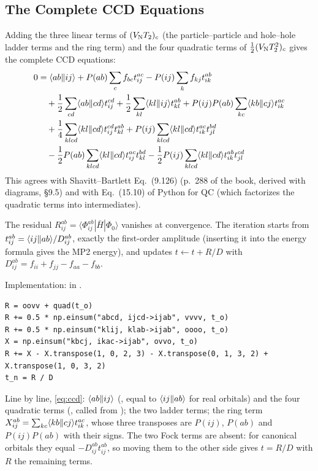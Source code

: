 \subsection{The Complete CCD Equations}

Adding the three linear terms of $(V_{\mathrm{N}} T_2)_c$ (the particle--particle and hole--hole ladder terms and the ring term) and the four quadratic terms of $\frac{1}{2} (V_{\mathrm{N}} T_2^2)_c$ gives the complete CCD equations:
\begin{align}
0 &= \langle ab\Vert ij\rangle + P(ab) \sum_c f_{bc} t_{ij}^{ac} - P(ij) \sum_k f_{kj} t_{ik}^{ab} \notag \\
&\quad + \frac{1}{2} \sum_{cd} \langle ab\Vert cd\rangle t_{ij}^{cd} + \frac{1}{2} \sum_{kl} \langle kl\Vert ij\rangle t_{kl}^{ab} + P(ij) P(ab) \sum_{kc} \langle kb\Vert cj\rangle t_{ik}^{ac} \notag \\
&\quad + \frac{1}{4} \sum_{klcd} \langle kl\Vert cd\rangle t_{ij}^{cd} t_{kl}^{ab} + P(ij) \sum_{klcd} \langle kl\Vert cd\rangle t_{ik}^{ac} t_{jl}^{bd} \notag \\
&\quad - \frac{1}{2} P(ab) \sum_{klcd} \langle kl\Vert cd\rangle t_{ij}^{ac} t_{kl}^{bd} - \frac{1}{2} P(ij) \sum_{klcd} \langle kl\Vert cd\rangle t_{ik}^{ab} t_{jl}^{cd} \label{eq:ccd}
\end{align}
This agrees with Shavitt--Bartlett Eq.~(9.126) (p.~288 of the book, derived with diagrams, §9.5) and with Eq.~(15.10) of Python for QC (which factorizes the quadratic terms into intermediates).

The residual $R_{ij}^{ab} = \langle \Phi_{ij}^{ab}|\bar{H}|\Phi_0\rangle$ vanishes at convergence. The iteration starts from $t_{ij}^{ab} = \langle ij\Vert ab\rangle / D_{ij}^{ab}$, exactly the first-order amplitude (inserting it into the energy formula gives the MP2 energy), and updates $t \leftarrow t + R / D$ with $D_{ij}^{ab} = f_{ii} + f_{jj} - f_{aa} - f_{bb}$.

Implementation:  in .

\begin{codemap}
\begin{lstlisting}[frame=none, numbers=none, xleftmargin=0pt, backgroundcolor={}]
R = oovv + quad(t_o)
R += 0.5 * np.einsum("abcd, ijcd->ijab", vvvv, t_o)
R += 0.5 * np.einsum("klij, klab->ijab", oooo, t_o)
X = np.einsum("kbcj, ikac->ijab", ovvo, t_o)
R += X - X.transpose(1, 0, 2, 3) - X.transpose(0, 1, 3, 2) + X.transpose(1, 0, 3, 2)
t_n = R / D
\end{lstlisting}
Line by line, \eqref{eq:ccd}: $\langle ab\Vert ij\rangle$ (, equal to $\langle ij\Vert ab\rangle$ for real orbitals) and the four quadratic terms (, called from ); the two ladder terms; the ring term $X_{ij}^{ab} = \sum_{kc} \langle kb\Vert cj\rangle t_{ik}^{ac}$, whose three transposes are $P(ij)$, $P(ab)$ and $P(ij) P(ab)$ with their signs. The two Fock terms are absent: for canonical orbitals they equal $-D_{ij}^{ab} t_{ij}^{ab}$, so moving them to the other side gives $t = R / D$ with $R$ the remaining terms.
\end{codemap}

